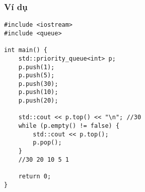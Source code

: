 \subsubsection{Ví dụ}
\begin{lstlisting}
#include <iostream>
#include <queue>

int main() {
    std::priority_queue<int> p;
    p.push(1);
    p.push(5);
    p.push(30);
    p.push(10);
    p.push(20);
    
    std::cout << p.top() << "\n"; //30
    while (p.empty() != false) {
        std::cout << p.top();
        p.pop();
    }
    //30 20 10 5 1
    
    return 0;
}
\end{lstlisting}